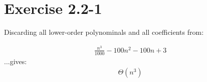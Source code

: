 \documentclass{article}
\begin{document}
\section*{Exercise 2.2-1}

Discarding all lower-order polynominals and all coefficients from:

\begin{eqnarray*}
	\frac{n^3}{1000} - 100 n^2 - 100 n + 3
\end{eqnarray*}
...gives:
\begin{eqnarray*}
	\Theta(n^3)
\end{eqnarray*}
\end{document}
